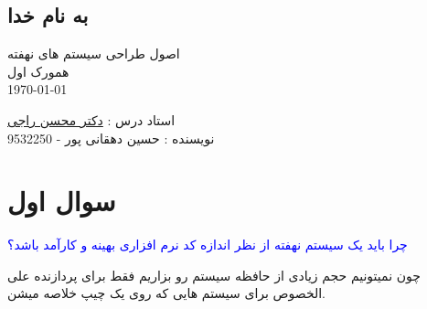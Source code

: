 \documentclass[12pt,a4paper]{article}							   %
\begin{document}
\thispagestyle{empty}

\begin{center}
	\section*{
	 \Huge 
	به نام خدا
	}
	\begin{RTL}
		\large  اصول طراحی سیستم های نهفته\\
		\large همورک اول \\
		\today
	\\[2\baselineskip]
	\end{RTL}
\end{center}



\begin{flushright}
	\begin{RTL} 
استاد درس :  \href{https://www.linkedin.com/in/mohsen-raji-97974452/}{دکتر محسن راجی}\\
 نویسنده : حسین دهقانی پور -   9532250

	
	\end{RTL}
\end{flushright}


\newpage
\tableofcontents
\begin{flushleft}


\end{flushleft}
\newpage

\section{سوال اول}
	\begin{RTL}
		\textcolor{blue}{
چرا باید یک سیستم نهفته از نظر اندازه کد نرم افزاری بهینه و کارآمد باشد؟ \\
		}
		
چون نمیتونیم حجم زیادی از حافظه سیستم رو بزاریم فقط برای پردازنده علی الخصوص برای سیستم هایی که روی یک چیپ خلاصه میشن. \\
		
	\end{RTL}
\newpage

\end{document}
